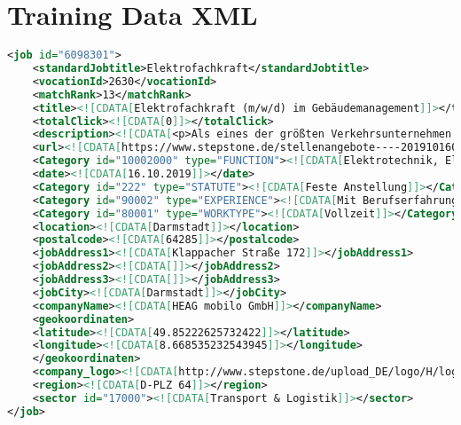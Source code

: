 	\section{Training Data XML}
	\begin{lstlisting}[language=xml,breaklines=true,label=lst:xml, caption={Training Data XML}]
<job id="6098301">
	<standardJobtitle>Elektrofachkraft</standardJobtitle>
	<vocationId>2630</vocationId>
	<matchRank>13</matchRank>
	<title><![CDATA[Elektrofachkraft (m/w/d) im Gebäudemanagement]]></title>
	<totalClick><![CDATA[0]]></totalClick>
	<description><![CDATA[<p>Als eines der größten Verkehrsunternehmen in Südhessen wollen wir den Menschen in Darmstadt und im Landkreis Darmstadt-Dieburg ihre Mobilität so einfach wie möglich machen. Daher engagieren wir uns für einen attraktiven und leistungsfähigen Nahverkehr in der Region. Zur Verstärkung unseres Teams im Gebäudemanagement suchen wir eine Elektrofachkraft*.</p>  <p><strong>Wir suchen eine</strong></p>  <p><strong>Elektrofachkraft (m/w/d) im Gebäudemanagement</strong></p><br /><ul>   <li>Beseitigung von elektronischen Störungen in der Gebäudetechnik</li>   <li>Installations-, Wartungs- und Instandhaltungsarbeiten an Elektroanlagen</li>   <li>Erstprüfungen nach DGUV-V3 von Elektrogeräten</li>   <li>Unterstützung im Bereich des Gebäudemanagements bei allen anfallenden Arbeiten an Betriebsgebäuden und Außenstellen</li>  </ul><br /><ul>   <li>Abgeschlossene technische Berufsausbildung als Elektroniker* (bevorzugt Elektrofachkraft für Gebäudetechnik)</li>   <li>Mehrjährige Berufserfahrung im elektrotechnischen Bereich</li>   <li>Weiterbildung zur befähigten Person zur Prüfung von Elektrogeräten</li>   <li>Pkw-Führerschein</li>  </ul><br /><ul>   <li>Kollegiales Arbeitsumfeld mit kurzen Entscheidungswegen</li>   <li>Festanstellung | Gleitzeit | Individuelle Weiterbildungsmöglichkeiten</li>   <li>60 % Zuschuss zum Jobticket | Fahrradleasing | Fitnessstudiorabatte</li>   <li>Betriebliche Altersversorgung | Zuschüsse für Zahnersatz und Brillen</li>   <li>Kostengünstiges Betriebsrestaurant</li>  </ul>]]></description>
	<url><![CDATA[https://www.stepstone.de/stellenangebote----20191016095639160---6098301-inline.html?cid=test_test_test]]></url>
	<Category id="10002000" type="FUNCTION"><![CDATA[Elektrotechnik, Elektronik]]></Category>
	<date><![CDATA[16.10.2019]]></date>
	<Category id="222" type="STATUTE"><![CDATA[Feste Anstellung]]></Category>
	<Category id="90002" type="EXPERIENCE"><![CDATA[Mit Berufserfahrung]]></Category>
	<Category id="80001" type="WORKTYPE"><![CDATA[Vollzeit]]></Category>
	<location><![CDATA[Darmstadt]]></location>
	<postalcode><![CDATA[64285]]></postalcode>
	<jobAddress1><![CDATA[Klappacher Straße 172]]></jobAddress1>
	<jobAddress2><![CDATA[]]></jobAddress2>
	<jobAddress3><![CDATA[]]></jobAddress3>
	<jobCity><![CDATA[Darmstadt]]></jobCity>
	<companyName><![CDATA[HEAG mobilo GmbH]]></companyName>
	<geokoordinaten>
	<latitude><![CDATA[49.85222625732422]]></latitude>
	<longitude><![CDATA[8.668535232543945]]></longitude>
	</geokoordinaten>
	<company_logo><![CDATA[http://www.stepstone.de/upload_DE/logo/H/logoHEAG_mobilo_GmbH_68344DE.gif]]></company_logo>
	<region><![CDATA[D-PLZ 64]]></region>
	<sector id="17000"><![CDATA[Transport & Logistik]]></sector>
</job>
	\end{lstlisting}
	\newpage
